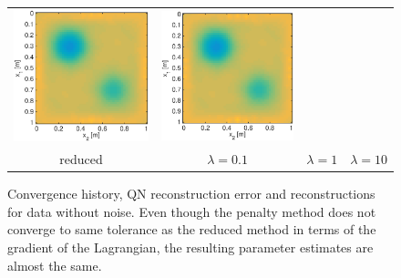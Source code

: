 \documentclass{iopart}
\begin{document}
\begin{figure}
\begin{tabular}{cccc}
\includegraphics[scale=.2]{./figs/2D_exp2_h}&
\includegraphics[scale=.2]{./figs/2D_exp2_i}\\
{\small reduced}&{\small $\lambda=0.1$}&{\small $\lambda=1$}&{\small $\lambda=10$}\\
\end{tabular}
\caption{Convergence history, QN reconstruction error and reconstructions for data without noise. Even though the penalty method does not converge to same tolerance as the reduced method in terms of the gradient of the Lagrangian, the resulting parameter estimates are almost the same.}
\label{fig:2D_exp2}
\end{figure}
\end{document}
